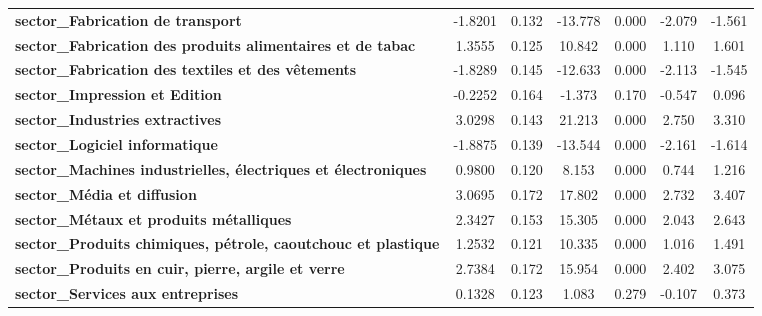 \begin{center}
\begin{tabular}{lcccccc}
\textbf{sector\_Fabrication de transport}                             &      -1.8201  &        0.132     &   -13.778  &         0.000        &       -2.079    &       -1.561     \\
\textbf{sector\_Fabrication des produits alimentaires et de tabac}    &       1.3555  &        0.125     &    10.842  &         0.000        &        1.110    &        1.601     \\
\textbf{sector\_Fabrication des textiles et des vêtements}            &      -1.8289  &        0.145     &   -12.633  &         0.000        &       -2.113    &       -1.545     \\
\textbf{sector\_Impression et Edition}                                &      -0.2252  &        0.164     &    -1.373  &         0.170        &       -0.547    &        0.096     \\
\textbf{sector\_Industries extractives}                               &       3.0298  &        0.143     &    21.213  &         0.000        &        2.750    &        3.310     \\
\textbf{sector\_Logiciel informatique}                                &      -1.8875  &        0.139     &   -13.544  &         0.000        &       -2.161    &       -1.614     \\
\textbf{sector\_Machines industrielles, électriques et électroniques} &       0.9800  &        0.120     &     8.153  &         0.000        &        0.744    &        1.216     \\
\textbf{sector\_Média et diffusion}                                   &       3.0695  &        0.172     &    17.802  &         0.000        &        2.732    &        3.407     \\
\textbf{sector\_Métaux et produits métalliques}                       &       2.3427  &        0.153     &    15.305  &         0.000        &        2.043    &        2.643     \\
\textbf{sector\_Produits chimiques, pétrole, caoutchouc et plastique} &       1.2532  &        0.121     &    10.335  &         0.000        &        1.016    &        1.491     \\
\textbf{sector\_Produits en cuir, pierre, argile et verre}            &       2.7384  &        0.172     &    15.954  &         0.000        &        2.402    &        3.075     \\
\textbf{sector\_Services aux entreprises}                             &       0.1328  &        0.123     &     1.083  &         0.279        &       -0.107    &        0.373     \\

\end{tabular}
\end{center}
